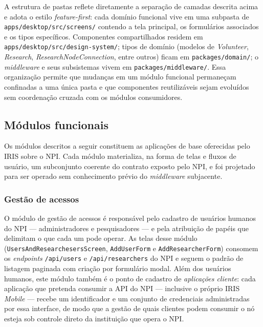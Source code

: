 A estrutura de pastas reflete diretamente a separação de camadas descrita acima e adota o estilo \textit{feature-first}: cada domínio funcional vive em uma subpasta de \texttt{apps/desktop/src/screens/} contendo a tela principal, os formulários associados e os tipos específicos. Componentes compartilhados residem em \texttt{apps/desktop/src/design-system/}; tipos de domínio (modelos de \textit{Volunteer}, \textit{Research}, \textit{ResearchNodeConnection}, entre outros) ficam em \texttt{packages/domain/}; o \textit{middleware} e seus subsistemas vivem em \texttt{packages/middleware/}. Essa organização permite que mudanças em um módulo funcional permaneçam confinadas a uma única pasta e que componentes reutilizáveis sejam evoluídos sem coordenação cruzada com os módulos consumidores.

\subsection{Módulos funcionais}\label{subsec:IRISModulos}

Os módulos descritos a seguir constituem as aplicações de base oferecidas pelo IRIS sobre o NPI. Cada módulo materializa, na forma de telas e fluxos de usuário, um subconjunto coerente do contrato exposto pelo NPI, e foi projetado para ser operado sem conhecimento prévio do \textit{middleware} subjacente.

\subsubsection{Gestão de acessos}\label{subsubsec:IRISAcessos}

O módulo de gestão de acessos é responsável pelo cadastro de usuários humanos do NPI --- administradores e pesquisadores --- e pela atribuição de papéis que delimitam o que cada um pode operar. As telas desse módulo (\texttt{UsersAndResearchesersScreen}, \texttt{AddUserForm} e \texttt{AddResearcherForm}) consomem os \textit{endpoints} \texttt{/api/users} e \texttt{/api/researchers} do NPI e seguem o padrão de listagem paginada com criação por formulário modal. Além dos usuários humanos, este módulo também é o ponto de cadastro de \textit{aplicações cliente}: cada aplicação que pretenda consumir a API do NPI --- inclusive o próprio IRIS \textit{Mobile} --- recebe um identificador e um conjunto de credenciais administradas por essa interface, de modo que a gestão de quais clientes podem consumir o nó esteja sob controle direto da instituição que opera o NPI.

